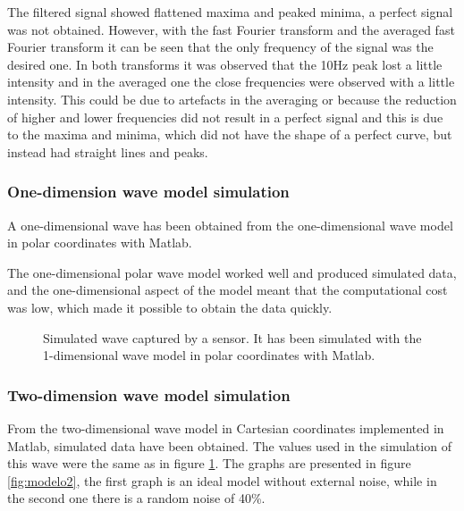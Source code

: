\documentclass[12pt, a4paper]{article} %
\begin{document}
	The filtered signal showed flattened maxima and peaked minima, a perfect signal was not obtained. However, with the fast Fourier transform and the averaged fast Fourier transform it can be seen that the only frequency of the signal was the desired one. In both transforms it was observed that the 10Hz peak lost a little intensity and in the averaged one the close frequencies were observed with a little intensity. This could be due to artefacts in the averaging or because the reduction of higher and lower frequencies did not result in a perfect signal and this is due to the maxima and minima, which did not have the shape of a perfect curve, but instead had straight lines and peaks.
	
	\setlength{\parskip}{0mm}
	
	\subsubsection{One-dimension wave model simulation}
	
	\setlength{\parskip}{0mm}
	
	A one-dimensional wave has been obtained from the one-dimensional wave model in polar coordinates with Matlab. 
	
	The one-dimensional polar wave model worked well and produced simulated data, and the one-dimensional aspect of the model meant that the computational cost was low, which made it possible to obtain the data quickly.
	\setlength{\parskip}{4mm}
	\begin{figure}[htbp]
		\centering
		
		\caption{Simulated wave captured by a sensor. It has been simulated with the 1-dimensional wave model in polar coordinates with Matlab.}
		\label{fig:modelo1}
	\end{figure}
	\setlength{\parskip}{0mm}
	
	\subsubsection{Two-dimension wave model simulation}
	
	From the two-dimensional wave model in Cartesian coordinates implemented in Matlab, simulated data have been obtained. The values used in the simulation of this wave were the same as in figure \ref{fig:modelo1}. The graphs are presented in figure \ref{fig:modelo2}, the first graph is an ideal model without external noise, while in the second one there is a random noise of 40\%.
	
\end{document}
